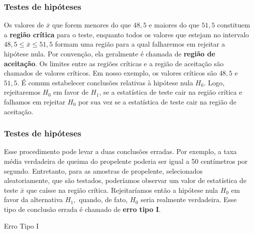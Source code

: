 \documentclass[14pt,aspectratio=1610]{beamer}
\begin{document}
\begin{frame}{}
\frametitle{Testes de hipóteses}
\begin{block}{}
\justifying
Os valores de $\bar{x}$ que forem menores do que $48,5$ e maiores do que $51,5$ constituem a \textbf{região crítica} para o teste, enquanto todos os valores que estejam 
no intervalo $48,5 \leq \bar{x}\leq 51,5$ formam uma região para a qual falharemos em rejeitar a hipótese nula. Por convenção, ela geralmente é chamada de 
\textbf{região de aceitação}. Os limites entre as regiões críticas e a região de aceitação são chamados de valores críticos. Em nosso exemplo, os valores críticos são 
$48,5$ e $51,5.$ É comum estabelecer conclusões relativas à hipótese nula $H_{0}.$ Logo, rejeitaremos $H_{0}$ em favor de $H_{1}$, se a estatística de teste cair 
na região crítica e falhamos em rejeitar $H_{0}$ por sua vez se a estatística de teste cair na região de aceitação.
 \end{block}
\end{frame}

\begin{frame}{}
\frametitle{Testes de hipóteses}
\begin{block}{}
\justifying
Esse procedimento pode levar a duas conclusões erradas. Por exemplo, a taxa média verdadeira de queima do propelente poderia ser igual a 50 centímetros por segundo. 
Entretanto, para as amostras de propelente, selecionados aleatoriamente, que são testados, poderíamos observar um valor de estatística de teste $\bar{x}$ que 
caísse na região crítica. Rejeitaríamos então a hipótese nula $H_{0}$ em favor da alternativa $H_{1},$ quando, de fato, $H_{0}$ seria realmente verdadeira. Esse tipo de 
conclusão errada é chamado de \textbf{erro tipo I}.
 \end{block}
\pause
\begin{block}{Erro Tipo I}

\end{block}
\end{frame}
\end{document}
